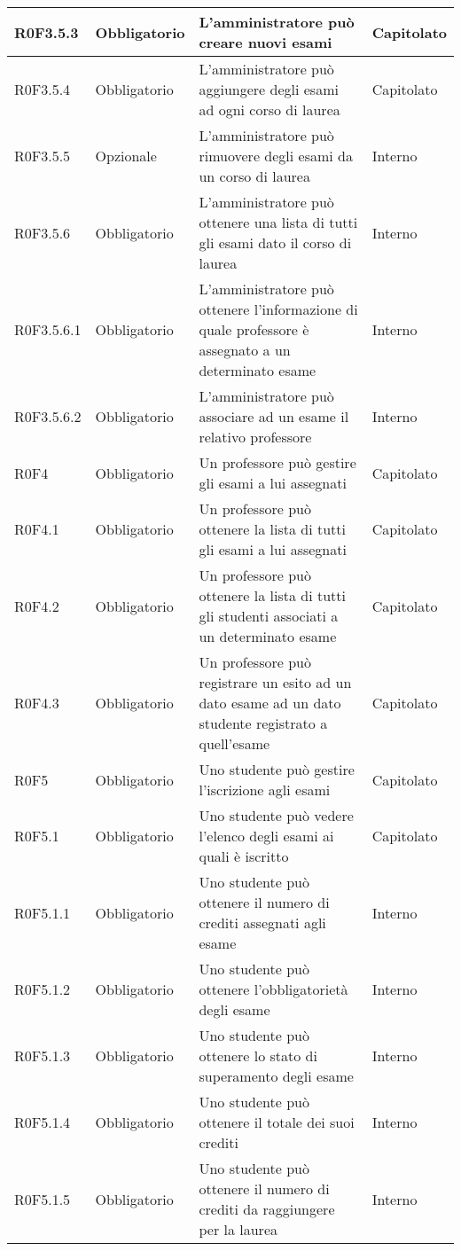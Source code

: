 \documentclass[AnalisiDeiRequisiti.tex]{subfiles}
\begin{document}
\begin{longtable}[H]{|p{2.5cm}|p{2.5cm}|p{5cm}|p{2cm}|}
	R0F3.5.3 & Obbligatorio & L'amministratore può creare nuovi esami & Capitolato \\ \hline
	R0F3.5.4 & Obbligatorio & L'amministratore può aggiungere degli esami ad ogni corso di laurea & Capitolato \\ \hline
	R0F3.5.5 & Opzionale & L'amministratore può rimuovere degli esami da un corso di laurea & Interno \\ \hline
	R0F3.5.6 & Obbligatorio & L'amministratore può ottenere una lista di tutti gli esami dato il corso di laurea & Interno \\ \hline
	R0F3.5.6.1 & Obbligatorio & L'amministratore può ottenere l'informazione di quale professore è assegnato a un determinato esame & Interno \\ \hline
	R0F3.5.6.2  & Obbligatorio & L'amministratore può associare ad un esame il relativo professore & Interno \\ \hline
	R0F4 & Obbligatorio & Un professore può gestire gli esami a lui assegnati & Capitolato \\ \hline
	R0F4.1 & Obbligatorio & Un professore può ottenere la lista di tutti gli esami a lui assegnati & Capitolato \\ \hline
	R0F4.2 & Obbligatorio & Un professore può ottenere la lista di tutti gli studenti associati a un determinato esame & Capitolato \\ \hline
	R0F4.3 & Obbligatorio & Un professore può registrare un esito ad un dato esame ad un dato studente registrato a quell'esame & Capitolato \\ \hline
	R0F5 & Obbligatorio & Uno studente può gestire l'iscrizione agli esami & Capitolato \\ \hline
	R0F5.1 & Obbligatorio & Uno studente può vedere l'elenco degli esami ai quali è iscritto & Capitolato \\ \hline
	R0F5.1.1 & Obbligatorio & Uno studente può ottenere il numero di crediti assegnati agli esame & Interno \\ \hline
	R0F5.1.2 & Obbligatorio & Uno studente può ottenere l'obbligatorietà degli esame & Interno \\ \hline
	R0F5.1.3 & Obbligatorio & Uno studente può ottenere lo stato di superamento degli esame & Interno \\ \hline
	R0F5.1.4 & Obbligatorio & Uno studente può ottenere il totale dei suoi crediti & Interno \\ \hline
	R0F5.1.5 & Obbligatorio & Uno studente può ottenere il numero di crediti da raggiungere per la laurea & Interno \\ \hline

\end{longtable}
\end{document}
